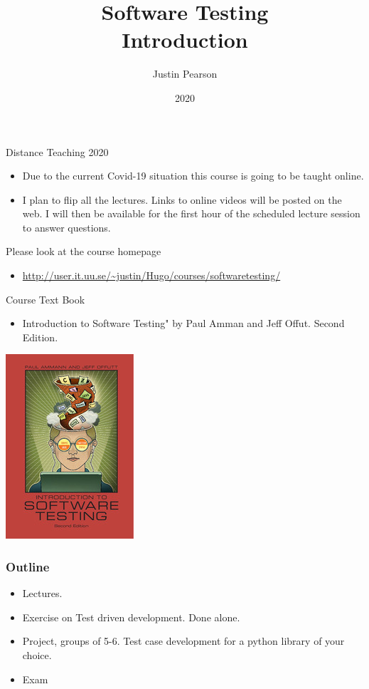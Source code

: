 \documentclass{beamer}
\title{Software Testing \\ Introduction}
\author{Justin Pearson}
\date{2020}
\begin{document}
\lstset{language=python}

\begin{frame}
  \maketitle
\end{frame}
\begin{frame}{Distance Teaching 2020}
  \begin{itemize}
  \item   Due to the current Covid-19 situation this course is going to be
  taught online. 
 \item  I plan to flip all the lectures. Links to online videos will
   be posted on the web. I will then  be available for the first hour
   of the scheduled lecture session to answer questions.
 \end{itemize}
 Please look at the course homepage
 \begin{itemize}
 \item \url{http://user.it.uu.se/~justin/Hugo/courses/softwaretesting/}
 \end{itemize}
\end{frame}
\begin{frame}{Course Text Book}
  \begin{itemize}
  \item Introduction to Software Testing" by Paul Amman and Jeff
    Offut. Second Edition. 
  \end{itemize}
  \includegraphics{textbookcover.jpg}
  
\end{frame}
\begin{frame}
  \frametitle{Outline}
  \begin{itemize}
  \item Lectures.
  \item Exercise on Test driven development. Done alone.
  \item Project, groups of 5-6. Test case development for a python
    library of your choice.
  \item Exam
  \end{itemize}
\end{frame}
\end{document}
